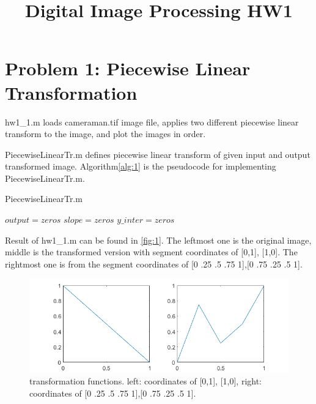 \documentclass[extendedabs]{bmvc2k}
\begin{document}
\title{Digital Image Processing HW1}

\maketitle
\vspace{-0.2in}

\section*{Problem 1: Piecewise Linear Transformation}
hw1\_1.m loads cameraman.tif image file, applies two different piecewise 
linear transform to the image, and plot the images in order.

PiecewiseLinearTr.m defines piecewise linear transform of given input and 
output transformed image.
Algorithm\ref{alg:1} is the pseudocode for implementing PiecewiseLinearTr.m.

\begin{algorithm}
\caption{PiecewiseLinearTr.m}
\label{alg:1}
$output = zeros$\;
$slope = zeros$\;
$y\_inter = zeros$\;

\end{algorithm}

Result of hw1\_1.m can be found in \figurename{\ref{fig:1}}. The leftmost one is the original image, 
middle is the transformed version with segment coordinates of [0,1], [1,0]. The rightmost one is from the
segment coordinates of [0 .25 .5 .75 1],[0 .75 .25 .5 1].

\begin{figure}[h]
    \centering
    \includegraphics[width=\linewidth]{hw1_1_2}
    \caption{transformation functions. 
    left: coordinates of [0,1], [1,0], right: coordinates of [0 .25 .5 .75 1],[0 .75 .25 .5 1].}
    \label{fig:2}
    \vspace{-2mm}
\end{figure}
\end{document}
